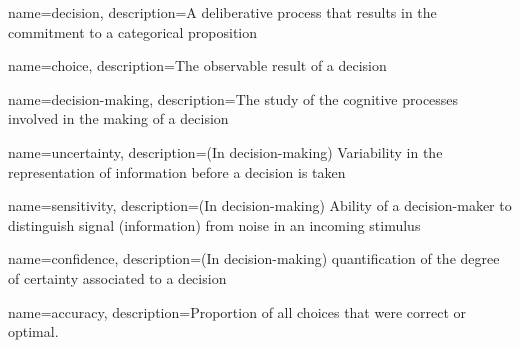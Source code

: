 {
    name=decision,
    description={A deliberative process that results in the commitment to a categorical proposition \cite{goldNeuralBasisDecision2007}}
}

{
    name=choice,
    description={The observable result of a decision}
}

{
    name=decision-making,
    description={The study of the cognitive processes involved in the making of a decision}
}

{
    name=uncertainty,
    description={(In decision-making) Variability in the representation of information before a decision is taken \cite{mamassianConfidenceForcedChoiceOther2020}}
}

{
    name=sensitivity,
    description={(In decision-making) Ability of a decision-maker to distinguish signal (information) from noise in an incoming stimulus}
}

{
    name=confidence,
    description={(In decision-making) quantification of the degree of certainty associated to a decision \cite{meynielConfidenceBayesianProbability2015}}
}

{
    name=accuracy,
    description={Proportion of all choices that were correct or optimal.}
}